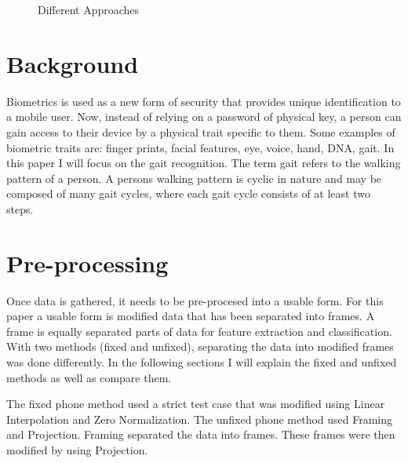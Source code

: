 \documentclass{sig-alternate}
\begin{document}
\begin{figure}
\centering
{}
\caption{Different Approaches}
\label{fig:AlgorithmProcess}
\end{figure}	




\section{Background}
	Biometrics is used as a new form of security that provides unique identification to a mobile user. Now, instead of relying on a password of physical key, a person can gain access to their device by a physical trait specific to them. Some examples of biometric traits are: finger prints, facial features, eye, voice, hand, DNA, gait. In this paper I will focus on the gait recognition. The term gait refers to the walking pattern of a person. A persons walking pattern is cyclic in nature and may be composed of many gait cycles, where each gait cycle consists of at least two steps.~\cite{Sujithra:2012} 


\section{Pre-processing} 
Once data is gathered, it needs to be pre-procesed into a usable form. For this paper a usable form is modified data that has been separated into frames. A frame is equally separated parts of data for feature extraction and classification. With two methods (fixed and unfixed), separating the data into modified frames was done differently. In the following sections I will explain the fixed and unfixed methods as well as compare them.

The fixed phone method used a strict test case that was modified using Linear Interpolation and Zero Normalization. The unfixed phone method used Framing and Projection. Framing separated the data into frames. These frames were then modified by using Projection. 
\end{document}
